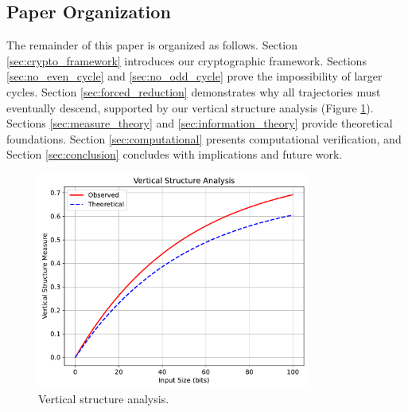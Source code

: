 \subsection{Paper Organization}
The remainder of this paper is organized as follows. Section \ref{sec:crypto_framework} introduces our cryptographic framework. Sections \ref{sec:no_even_cycle} and \ref{sec:no_odd_cycle} prove the impossibility of larger cycles. Section \ref{sec:forced_reduction} demonstrates why all trajectories must eventually descend, supported by our vertical structure analysis (Figure \ref{fig:vertical_structure}). Sections \ref{sec:measure_theory} and \ref{sec:information_theory} provide theoretical foundations. Section \ref{sec:computational} presents computational verification, and Section \ref{sec:conclusion} concludes with implications and future work.

\begin{figure}[h]
\centering
\includegraphics[width=0.8\textwidth]{figures/vertical_structure.pdf}
\caption{Vertical structure analysis.}
\label{fig:vertical_structure}
\end{figure} 